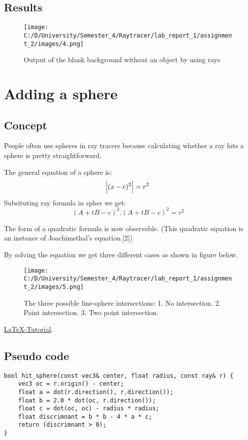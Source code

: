 \documentclass{article}
\begin{document}
\subsection{Results}
\begin{figure}[H]
	
	\texttt{[image: C:/D/University/Semester\_4/Raytracer/lab\_report\_1/assignment\_2/images/4.png]}
	
	\caption{Output of the blank background without an object by using rays}
	\label{fig:boat1}
\end{figure}

\section{Adding a sphere}
\subsection{Concept}
People often use spheres in ray tracers because
calculating whether a ray hits a sphere is pretty straightforward.

The general equation of a sphere is: \[ \abs{(x - c)^2} = r^2\] 
Subsituting ray formula in spher we get: 
\[ (A + tB - c)^2.(A + tB - c)^2 = r^2\] 

The form of a quadratic formula is now observable. (This quadratic equation is an instance of Joachimsthal's equation.[2])

By solving the equation we get three different cases as shown in figure below.
\begin{figure}[H]
	
	\texttt{[image: C:/D/University/Semester\_4/Raytracer/lab\_report\_1/assignment\_2/images/5.png]}
	
	\caption{The three possible line-sphere intersections:
		1. No intersection.
		2. Point intersection.
		3. Two point intersection.}
	\label{fig:boat1}
\end{figure}
\href{https://en.wikipedia.org/wiki/Line%E2%80%93sphere_intersection}{LaTeX-Tutorial}.
\subsection{Pseudo code}
\begin{lstlisting}
bool hit_sphere(const vec3& center, float radius, const ray& r) {
	vec3 oc = r.origin() - center;
	float a = dot(r.direction(), r.direction());
	float b = 2.0 * dot(oc, r.direction());
	float c = dot(oc, oc) - radius * radius;
	float discrimnant = b * b - 4 * a * c;
	return (discrimnant > 0);
}
\end{lstlisting}
\end{document}

